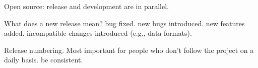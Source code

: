 \documentclass[landscape,30pt]{foils}
\begin{document}











Open source: release and development are in parallel.

What does a new release mean? bug fixed. new bugs introduced. new features added. incompatible changes introduced (e.g., data formats).

Release numbering.   Most important for people who don't follow the project on a daily basis.  be consistent. 


\end{document}
